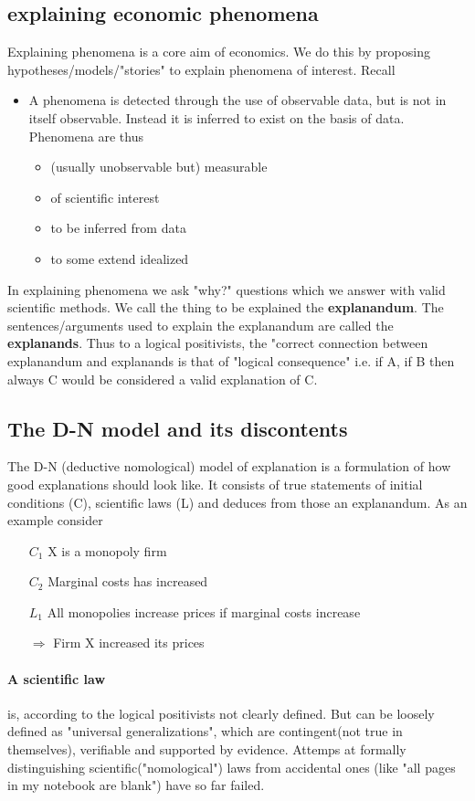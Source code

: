 \documentclass[12pt, a4paper]{article}
\begin{document}
\begin{multicols}{2}
\subsection{explaining economic phenomena}
Explaining phenomena is a core aim of economics. We do this by proposing hypotheses/models/"stories" to explain phenomena of interest. Recall
\begin{itemize}
\item A phenomena is detected through the use of observable data, but is not in itself observable. Instead it is inferred to exist on the basis of data. Phenomena are thus
\begin{itemize}
\item (usually unobservable but) measurable
\item of scientific interest
\item to be inferred from data
\item to some extend idealized
\end{itemize}
\end{itemize}
In explaining phenomena we ask "why?" questions which we answer with valid scientific methods. We call the thing to be explained the \textbf{explanandum}. The sentences/arguments used to explain the explanandum are called the \textbf{explanands}. Thus to a logical positivists, the "correct connection between explanandum and explanands is that of "logical consequence" i.e. if A, if B then always C would be considered a valid explanation of C.

\subsection{The D-N model and its discontents}
The D-N (deductive nomological) model of explanation is a formulation of how good explanations should look like. It consists of true statements of initial conditions (C), scientific laws (L) and deduces from those an explanandum. As an example consider 
\begin{itemize}
\item[$C_1$] X is a monopoly firm
\item[$C_2$] Marginal costs has increased
\item[$L_1$] All monopolies increase prices if marginal costs increase
\item[$\Rightarrow$] Firm X increased its prices
\end{itemize}

\paragraph{A scientific law} is, according to the logical positivists not clearly defined. But can be loosely defined as "universal generalizations", which are contingent(not true in themselves), verifiable and supported by evidence. Attemps at formally distinguishing scientific("nomological") laws from accidental ones (like "all pages in my notebook are blank") have so far failed.


\end{multicols}
\end{document}
